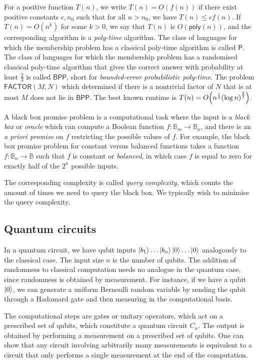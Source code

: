 For a positive function \( T(n) \), we write \( T(n) = O(f(n)) \) if there exist positive constants \( c, n_0 \) such that for all \( n > n_0 \), we have \( T(n) \leq cf(n) \).
If \( T(n) = O(n^k) \) for some \( k > 0 \), we say that \( T(n) \) is \( O(\mathsf{poly}(n)) \), and the corresponding algorithm is a \emph{poly-time} algorithm.
The class of languages for which the membership problem has a classical poly-time algorithm is called \( \mathsf{P} \).
The class of languages for which the membership problem has a randomised classical poly-time algorithm that gives the correct answer with probability at least \( \frac{2}{3} \) is called \( \mathsf{BPP} \), short for \emph{bounded-error probabilistic poly-time}.
The problem \( \mathsf{FACTOR}(M,N) \) which determined if there is a nontrivial factor of \( N \) that is at most \( M \) does not lie in \( \mathsf{BPP} \).
The best known runtime is \( T(n) = O\qty(n^{\frac{1}{3}}\qty(\log n)^\frac{2}{3}) \).

A black box promise problem is a computational task where the input is a \emph{black box} or \emph{oracle} which can compute a Boolean function \( f \colon \mathbb B_m \to \mathbb B_n \), and there is an \emph{a priori promise} on \( f \) restricting the possible values of \( f \).
For example, the black box promise problem for constant versus balanced functions takes a function \( f \colon \mathbb B_n \to \mathbb B \) such that \( f \) is constant or \emph{balanced}, in which case \( f \) is equal to zero for exactly half of the \( 2^n \) possible inputs.

The corresponding complexity is called \emph{query complexity}, which counts the amount of times we need to query the black box.
We typically wish to minimise the query complexity.

\subsection{Quantum circuits}
In a quantum circuit, we have qubit inputs \( \ket{b_1} \dots \ket{b_n} \ket{0} \dots \ket{0} \) analogously to the classical case.
The input size \( n \) is the number of qubits.
The addition of randomness to classical computation needs no analogue in the quantum case, since randomness is obtained by measurement.
For instance, if we have a qubit \( \ket{0} \), we can generate a uniform Bernoulli random variable by sending the qubit through a Hadamard gate and then measuring in the computational basis.

The computational steps are gates or unitary operators, which act on a prescribed set of qubits, which constitute a quantum circuit \( C_n \).
The output is obtained by performing a measurement on a prescribed set of qubits.
One can show that any circuit involving arbitrarily many measurements is equivalent to a circuit that only performs a single measurement at the end of the computation.

